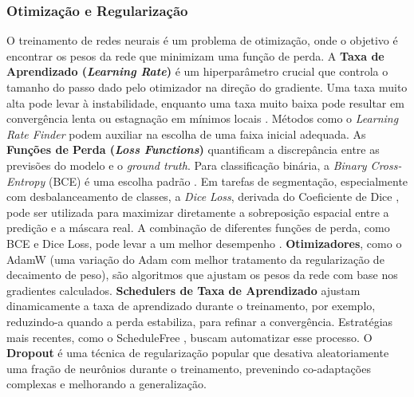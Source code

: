 \subsubsection{Otimização e Regularização}\label{subsubsec:otimizacao_regularizacao}
O treinamento de redes neurais é um problema de otimização, onde o objetivo é encontrar os pesos da rede que minimizam uma função de perda.
A \textbf{Taxa de Aprendizado (\textit{Learning Rate})} é um hiperparâmetro crucial que controla o tamanho do passo dado pelo otimizador na direção do gradiente. Uma taxa muito alta pode levar à instabilidade, enquanto uma taxa muito baixa pode resultar em convergência lenta ou estagnação em mínimos locais \cite{Goodfellow2016}. Métodos como o \textit{Learning Rate Finder} \cite{Smith2017} podem auxiliar na escolha de uma faixa inicial adequada.
As \textbf{Funções de Perda (\textit{Loss Functions})} quantificam a discrepância entre as previsões do modelo e o \textit{ground truth}. Para classificação binária, a \textit{Binary Cross-Entropy} (BCE) é uma escolha padrão \cite{Goodfellow2016}. Em tarefas de segmentação, especialmente com desbalanceamento de classes, a \textit{Dice Loss}, derivada do Coeficiente de Dice \cite{Dice1945, Milletari2016}, pode ser utilizada para maximizar diretamente a sobreposição espacial entre a predição e a máscara real. A combinação de diferentes funções de perda, como BCE e Dice Loss, pode levar a um melhor desempenho \cite{Khened2021}.
\textbf{Otimizadores}, como o AdamW \cite{Loshchilov2019} (uma variação do Adam \cite{Kingma2014} com melhor tratamento da regularização de decaimento de peso), são algoritmos que ajustam os pesos da rede com base nos gradientes calculados.
\textbf{Schedulers de Taxa de Aprendizado} ajustam dinamicamente a taxa de aprendizado durante o treinamento, por exemplo, reduzindo-a quando a perda estabiliza, para refinar a convergência. Estratégias mais recentes, como o ScheduleFree \cite{Defazio2024}, buscam automatizar esse processo.
O \textbf{Dropout} \cite{Srivastava2014} é uma técnica de regularização popular que desativa aleatoriamente uma fração de neurônios durante o treinamento, prevenindo co-adaptações complexas e melhorando a generalização.

